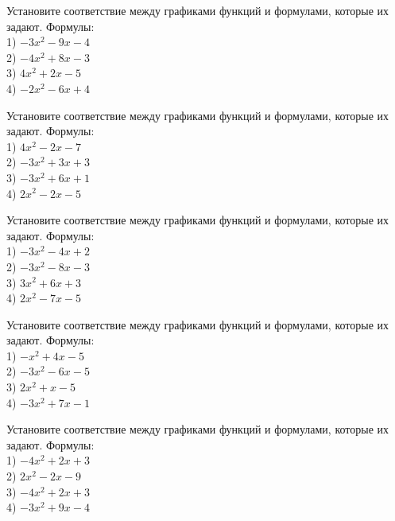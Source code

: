 \documentclass[4apaper]{article}
\begin{document}
\begin{taskBN}{22}
Установите соответствие между графиками функций и формулами, которые их задают. Формулы: \\1) $-3x^2-9x-4$\\2) $-4x^2+8x-3$\\3) $4x^2+2x-5$\\4) $-2x^2-6x+4$
\end{taskBN}

\begin{taskBN}{23}
Установите соответствие между графиками функций и формулами, которые их задают. Формулы: \\1) $4x^2-2x-7$\\2) $-3x^2+3x+3$\\3) $-3x^2+6x+1$\\4) $2x^2-2x-5$
\end{taskBN}

\begin{taskBN}{24}
Установите соответствие между графиками функций и формулами, которые их задают. Формулы: \\1) $-3x^2-4x+2$\\2) $-3x^2-8x-3$\\3) $3x^2+6x+3$\\4) $2x^2-7x-5$
\end{taskBN}

\begin{taskBN}{25}
Установите соответствие между графиками функций и формулами, которые их задают. Формулы: \\1) $-x^2+4x-5$\\2) $-3x^2-6x-5$\\3) $2x^2+x-5$\\4) $-3x^2+7x-1$
\end{taskBN}

\begin{taskBN}{26}
Установите соответствие между графиками функций и формулами, которые их задают. Формулы: \\1) $-4x^2+2x+3$\\2) $2x^2-2x-9$\\3) $-4x^2+2x+3$\\4) $-3x^2+9x-4$
\end{taskBN}
\end{document}
